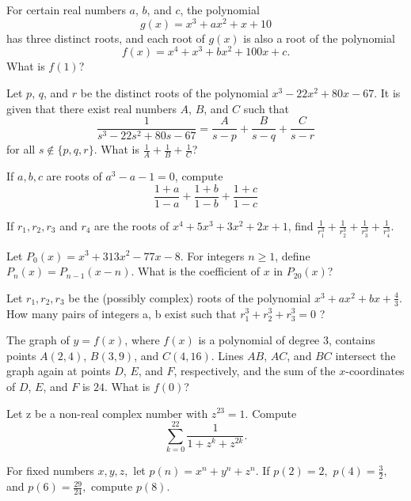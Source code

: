 \documentclass[mast]{lucky}
\begin{document}
\begin{prob}[AMC 10A 2017/24]{3}
For certain real numbers $a$, $b$, and $c$, the polynomial\[g(x) = x^3 + ax^2 + x + 10\]has three distinct roots, and each root of $g(x)$ is also a root of the polynomial\[f(x) = x^4 + x^3 + bx^2 + 100x + c.\]What is $f(1)$?
\end{prob}

\begin{req}[AMC 10A 2019/24]{3}
Let $p$, $q$, and $r$ be the distinct roots of the polynomial $x^3 - 22x^2 + 80x - 67$. It is given that there exist real numbers $A$, $B$, and $C$ such that $$\dfrac{1}{s^3 - 22s^2 + 80s - 67} = \dfrac{A}{s-p} + \dfrac{B}{s-q} + \frac{C}{s-r}$$for all $s\not\in\{p,q,r\}$. What is $\tfrac1A+\tfrac1B+\tfrac1C$?
\end{req}

\begin{prob}[Canada]{3}
If $a,b,c$ are roots of $a^3-a-1=0$, compute
$$\frac{1+a}{1-a}+\frac{1+b}{1-b}+\frac{1+c}{1-c}$$
\end{prob}

\begin{prob}{3}
If $r_{1},r_{2},r_{3}$ and $r_{4}$ are the roots of $x^4+5x^3+3x^2+2x+1$, find $\frac{1}{r_{1}^3}+\frac{1}{r_{2}^3}+\frac{1}{r_{3}^3}+\frac{1}{r_{4}^3}$.
\end{prob}

\begin{prob}[AIME 1993/5]{3}
Let $P_0(x) = x^3 + 313x^2 - 77x - 8$. For integers $n \ge 1$, define $P_n(x) = P_{n - 1}(x - n)$. What is the coefficient of $x$ in $P_{20}(x)$?
\end{prob}

\begin{prob}[BMT 2019]{4}

Let $r_1, r_2, r_3$ be the (possibly complex) roots of the polynomial $x^3 + ax^2 + bx + \frac{4}{3}$. How many
pairs of integers a, b exist such that $r_{1}^3 + r_{2}^3 + r_{3}^3 = 0$ ?
\end{prob}

\begin{req}[AMC 12B 2017/23]{4}
The graph of $y=f(x)$, where $f(x)$ is a polynomial of degree $3$, contains points $A(2,4)$, $B(3,9)$, and $C(4,16)$. Lines $AB$, $AC$, and $BC$ intersect the graph again at points $D$, $E$, and $F$, respectively, and the sum of the $x$-coordinates of $D$, $E$, and $F$ is $24$. What is $f(0)$?
\end{req}

\begin{prob}{4}
Let z be a non-real complex number with $z^{23} = 1$. Compute
$$\sum_{k=0}^{22} \frac{1}{1+z^{k}+z^{2k}}.$$
\end{prob}
\begin{prob}[FARML 2007/T9]{4}
For fixed numbers $x,y,z,$ let $p(n)=x^n+y^n+z^n.$ If $p(2)=2,$ $p(4)=\frac{3}{2},$ and $p(6)=\frac{29}{24},$ compute $p(8).$
\end{prob}
\end{document}
